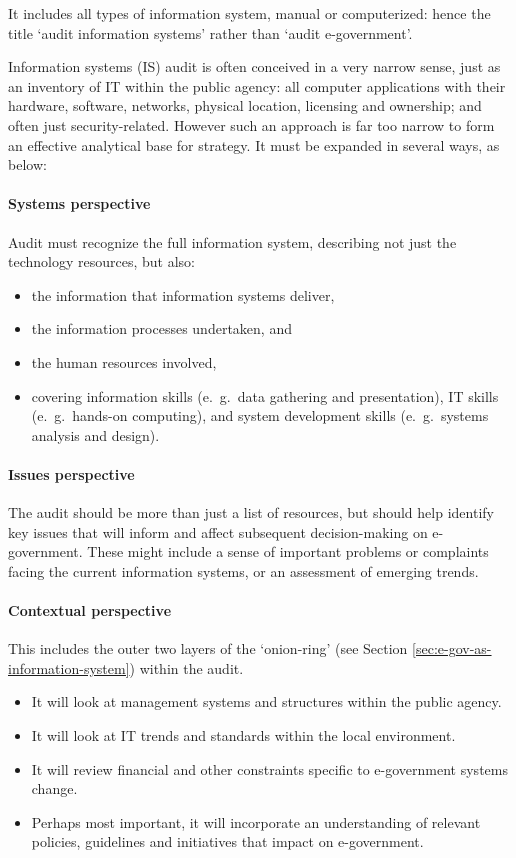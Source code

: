 It includes all types of information system, manual or computerized: hence the title ‘audit information systems’ rather than ‘audit e-government’.


Information systems (IS) audit is often
conceived in a very narrow sense, just as
an inventory of IT within the public
agency: all computer applications with
their hardware, software, networks, physical location, licensing and ownership; and
often just security-related. However such an approach is far too narrow to form an effective analytical base for strategy. It must be expanded in several ways, as below:

\paragraph*{Systems perspective}
Audit must recognize the full information system, describing not just the technology resources, but also: 
\begin{itemize}
	\item the information that information systems deliver, 
	\item the information processes undertaken, and 
	\item the human resources involved,
	\item covering information skills (e.\ g.\ data gathering and presentation), IT skills (e.\ g.\	hands-on computing), and system development skills (e.\ g.\ systems analysis and design).
\end{itemize}


\paragraph*{Issues perspective}
The audit should be more than just a list of
resources, but should help identify key
issues that will inform and affect subsequent decision-making on e-government.
These might include a sense of important
problems or complaints facing the current
information systems, or an assessment of
emerging trends.

\paragraph*{Contextual perspective}
This includes the outer two layers of the
‘onion-ring’ (see Section \ref{sec:e-gov-as-information-system}) within the
audit.

\begin{itemize}
	\item It will look at management systems and structures within the public agency.
	\item It will look at IT trends and standards within the local environment. 
	\item It will review financial and other constraints specific to e-government systems change. 
	\item Perhaps most important, it will incorporate an understanding of relevant policies, guidelines and initiatives that impact on	e-government. 
\end{itemize}


